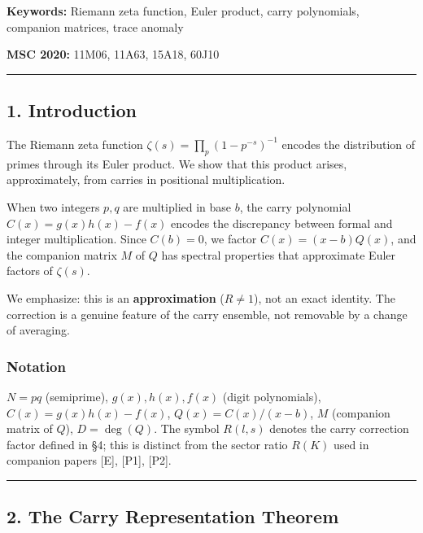 \documentclass[
  11pt,
]{article}
\begin{document}
\textbf{Keywords:} Riemann zeta function, Euler product, carry polynomials,
companion matrices, trace anomaly

\textbf{MSC 2020:} 11M06, 11A63, 15A18, 60J10

\begin{center}\rule{0.5\linewidth}{0.5pt}\end{center}

\newpage

\subsection{1. Introduction}\label{introduction}

The Riemann zeta function \(\zeta(s) = \prod_p(1-p^{-s})^{-1}\) encodes the
distribution of primes through its Euler product. We show that this product
arises, approximately, from carries in positional multiplication.

When two integers \(p, q\) are multiplied in base \(b\), the carry polynomial
\(C(x) = g(x)h(x) - f(x)\) encodes the discrepancy between formal and integer
multiplication. Since \(C(b) = 0\), we factor \(C(x) = (x-b)Q(x)\), and the
companion matrix \(M\) of \(Q\) has spectral properties that approximate Euler
factors of \(\zeta(s)\).

We emphasize: this is an \textbf{approximation} (\(R \neq 1\)), not an exact
identity. The correction is a genuine feature of the carry ensemble, not
removable by a change of averaging.

\subsubsection{Notation}\label{notation}

\(N = pq\) (semiprime), \(g(x), h(x), f(x)\) (digit polynomials),
\(C(x) = g(x)h(x) - f(x)\), \(Q(x) = C(x)/(x-b)\), \(M\) (companion matrix of
\(Q\)), \(D = \deg(Q)\). The symbol \(R(l,s)\) denotes the carry correction
factor defined in §4; this is distinct from the sector ratio \(R(K)\) used in
companion papers {[}E{]}, {[}P1{]}, {[}P2{]}.

\begin{center}\rule{0.5\linewidth}{0.5pt}\end{center}

\newpage

\subsection{2. The Carry Representation
Theorem}\label{the-carry-representation-theorem}
\end{document}
